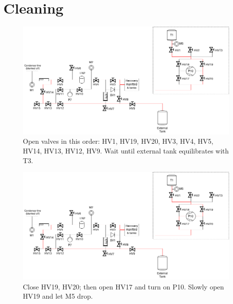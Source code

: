 \documentclass[a4paper,10pt]{article}
\begin{document}
\section{Cleaning}

\begin{figure}[htbp!]
 \centering
 \includegraphics[width=\textwidth]{./mash-cleaning-schematic-2-gas-to-ext-tank.png}
 \caption{Open valves in this order: HV1, HV19, HV20, HV3, HV4, HV5, HV14, HV13, HV12, HV9.  Wait until external tank equilibrates with T3.}
 \label{b}
\end{figure}

\begin{figure}[htbp!]
 \centering
 \includegraphics[width=\textwidth]{./mash-cleaning-schematic-3-pump-gas-to-ext-tank.png}
 \caption{Close HV19, HV20; then open HV17 and turn on P10.  Slowly open HV19 and let M5 drop.}
 \label{c}
\end{figure}
\end{document}

